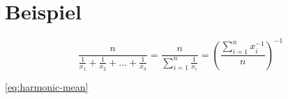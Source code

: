 \section{Beispiel}

\begin{equation}
	\frac{n}{\frac{1}{x_1}+\frac{1}{x_2}+\ldots+\frac{1}{x_3}}=\frac{n}{\displaystyle\sum_{i=1}^{n}\frac{1}{x_i}}=\left(\frac{\displaystyle\sum_{i=1}^{n}x_i^{-1}}{n}\right)^{-1}
	\label{eq:harmonic-mean}
\end{equation}

\autoref{eq:harmonic-mean}

\cite{Korte2018}